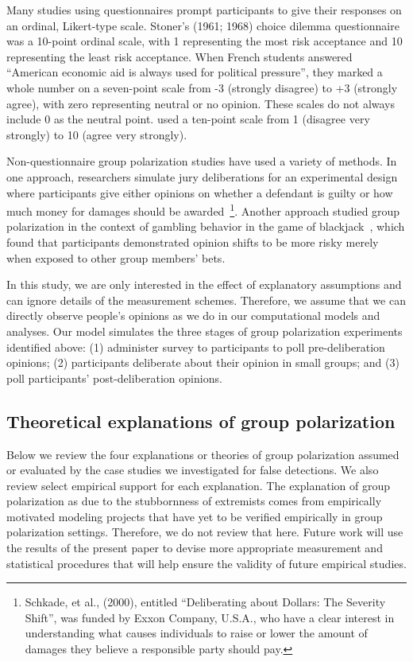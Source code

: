 Many studies using questionnaires
prompt participants to give their responses on an ordinal, Likert-type scale.
Stoner's (1961; 1968) choice dilemma questionnaire was a 10-point ordinal
scale, with 1 representing the most risk acceptance and 10 representing the
least risk acceptance. When French students answered ``American economic aid
is always used for political pressure'', they marked a whole number on
a seven-point scale from
-3 (strongly disagree) to +3 (strongly agree), with zero representing 
neutral or no opinion. These scales do not always include 0 as the neutral
point.  used a ten-point scale from 1 (disagree very strongly)
to 10 (agree very strongly). 

Non-questionnaire group polarization studies have used a variety of 
methods. In one approach, researchers simulate jury deliberations
for an experimental design where participants give either opinions
on whether a defendant is guilty or how much money for damages should be
awarded~\cite{Kaplan1977,Kaplan1977a,Schkade2000,Schkade2007,Sunstein2000}\footnote{
Schkade, et al., (2000), entitled ``Deliberating about Dollars: The Severity Shift'',
was funded by Exxon Company, U.S.A., who have a clear interest in understanding
what causes individuals to raise or lower the amount of damages they believe
a responsible party should pay.}. Another approach studied group
polarization in the context of gambling behavior in the game of 
blackjack~\cite{Blascovich1974,Blascovich1975,Blascovich1976}, which
found that participants demonstrated opinion shifts to be more risky merely
when exposed to other group members' bets. 

In this study, we are only interested in the effect of explanatory assumptions
and can ignore details of the measurement schemes. Therefore, 
we assume that we can directly observe people's opinions as we do in our
computational models and analyses. Our model simulates the three stages
of group polarization experiments identified above: (1) administer survey
to participants to poll pre-deliberation opinions; (2) participants deliberate
about their opinion in small groups; and (3) poll participants' post-deliberation
opinions.


\subsection{Theoretical explanations of group polarization}

Below we review the four explanations or theories of group polarization 
assumed or evaluated by the case studies we investigated for false detections. 
We also review select empirical support for each explanation.
The explanation of group polarization as due to the stubbornness of 
extremists comes from empirically motivated modeling 
projects that have yet to be verified empirically in group polarization settings.
Therefore, we do not review that here. Future work will use the results of
the present paper to devise more appropriate measurement and statistical 
procedures that will help ensure the validity of future empirical studies.

